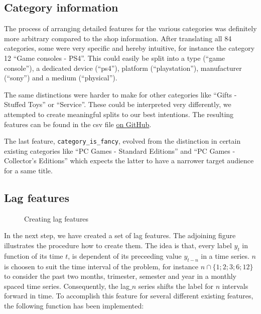 \subsection{Category information}

The process of arranging detailed features for the various categories was definitely more arbitrary compared to the shop information. After translating all 84 categories, some were very specific and hereby intuitive, for instance the category 12 \enquote{Game consoles - PS4}. This could easily be split into a type (\enquote{game console}), a dedicated device (\enquote{ps4}), platform (\enquote{playstation}), manufacturer (\enquote{sony}) and a medium (\enquote{physical}).

The same distinctions were harder to make for other categories like \enquote{Gifts - Stuffed Toys} or \enquote{Service}. These could be interpreted very differently, we attempted to create meaningful splits to our best intentions. The resulting features can be found in the \acrshort{csv} file \href{\repoblobbaseurl\finalCommit/data/feature_engineering/cities.csv}{on GitHub}.

The last feature, \texttt{category\_is\_fancy}, evolved from the distinction in certain existing categories like \enquote{PC Games - Standard Editions} and \enquote{PC Games - Collector's Editions} which expects the latter to have a narrower target audience for a same title.

\subsection{Lag features}

\begin{wrapfigure}[8]{l}{0.48\textwidth}
\centering

\captionsetup{justification=centering}
\caption{Creating lag features}
\label{lag}
\end{wrapfigure}


In the next step, we have created a set of lag features. The adjoining figure illustrates the procedure how to create them. The idea is that, every label $y_t$ in function of its time $t$, is dependent of its preceeding value $y_{t-n}$ in a time series. $n$ is choosen to suit the time interval of the problem, for instance $n \cap \{1;2;3;6;12\}$ to consider the past two months, trimester, semester and year in a monthly spaced time series. Consequently, the lag$\_n$ series shifts the label for $n$ intervals forward in time. To accomplish this feature for several different existing features, the following function has been implemented:


